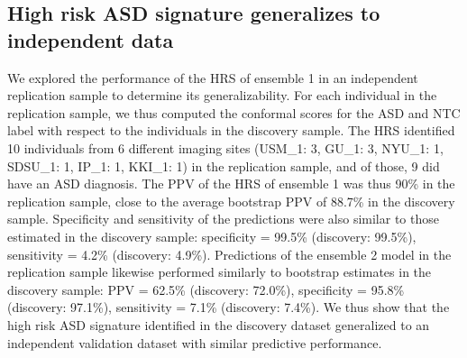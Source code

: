 \documentclass[9pt,lineno]{elife}
\begin{document}
\subsection{High risk ASD signature generalizes to independent data}
We explored the performance of the HRS of ensemble 1 in an independent replication sample to determine its generalizability. For each individual in the replication sample, we thus computed the conformal scores for the ASD and NTC label with respect to the individuals in the discovery sample. The HRS identified 10 individuals from 6 different imaging sites (USM\_1: 3, GU\_1: 3, NYU\_1: 1, SDSU\_1: 1, IP\_1: 1, KKI\_1: 1) in the replication sample, and of those, 9 did have an ASD diagnosis. The PPV of the HRS of ensemble 1 was thus 90\% in the replication sample, close to the average bootstrap PPV of 88.7\% in the discovery sample. Specificity and sensitivity of the predictions were also similar to those estimated in the discovery sample: specificity = 99.5\% (discovery: 99.5\%), sensitivity = 4.2\% (discovery: 4.9\%). Predictions of the ensemble 2 model in the replication sample likewise performed similarly to bootstrap estimates in the discovery sample: PPV = 62.5\% (discovery: 72.0\%), specificity = 95.8\% (discovery: 97.1\%), sensitivity = 7.1\% (discovery: 7.4\%). We thus show that the high risk ASD signature identified in the discovery dataset generalized to an independent validation dataset with similar predictive performance.
\end{document}
